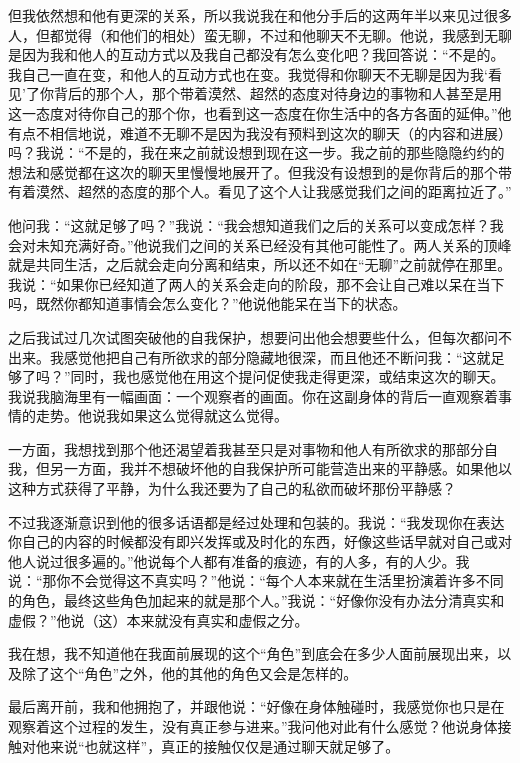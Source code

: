 但我依然想和他有更深的关系，所以我说我在和他分手后的这两年半以来见过很多人，但都觉得（和他们的相处）蛮无聊，不过和他聊天不无聊。他说，我感到无聊是因为我和他人的互动方式以及我自己都没有怎么变化吧？我回答说：“不是的。我自己一直在变，和他人的互动方式也在变。我觉得和你聊天不无聊是因为我‘看见’了你背后的那个人，那个带着漠然、超然的态度对待身边的事物和人甚至是用这一态度对待你自己的那个你，也看到这一态度在你生活中的各方各面的延伸。”他有点不相信地说，难道不无聊不是因为我没有预料到这次的聊天（的内容和进展）吗？我说：“不是的，我在来之前就设想到现在这一步。我之前的那些隐隐约约的想法和感觉都在这次的聊天里慢慢地展开了。但我没有设想到的是你背后的那个带有着漠然、超然的态度的那个人。看见了这个人让我感觉我们之间的距离拉近了。”

他问我：“这就足够了吗？”我说：“我会想知道我们之后的关系可以变成怎样？我会对未知充满好奇。”他说我们之间的关系已经没有其他可能性了。两人关系的顶峰就是共同生活，之后就会走向分离和结束，所以还不如在“无聊”之前就停在那里。我说：“如果你已经知道了两人的关系会走向的阶段，那不会让自己难以呆在当下吗，既然你都知道事情会怎么变化？”他说他能呆在当下的状态。

\tristarsepline

之后我试过几次试图突破他的自我保护，想要问出他会想要些什么，但每次都问不出来。我感觉他把自己有所欲求的部分隐藏地很深，而且他还不断问我：“这就足够了吗？”同时，我也感觉他在用这个提问促使我走得更深，或结束这次的聊天。我说我脑海里有一幅画面：一个观察者的画面。你在这副身体的背后一直观察着事情的走势。他说我如果这么觉得就这么觉得。

一方面，我想找到那个他还渴望着我甚至只是对事物和他人有所欲求的那部分自我，但另一方面，我并不想破坏他的自我保护所可能营造出来的平静感。如果他以这种方式获得了平静，为什么我还要为了自己的私欲而破坏那份平静感？

\tristarsepline

不过我逐渐意识到他的很多话语都是经过处理和包装的。我说：“我发现你在表达你自己的内容的时候都没有即兴发挥或及时化的东西，好像这些话早就对自己或对他人说过很多遍的。”他说每个人都有准备的痕迹，有的人多，有的人少。我说：“那你不会觉得这不真实吗？”他说：“每个人本来就在生活里扮演着许多不同的角色，最终这些角色加起来的就是那个人。”我说：“好像你没有办法分清真实和虚假？”他说（这）本来就没有真实和虚假之分。

我在想，我不知道他在我面前展现的这个“角色”到底会在多少人面前展现出来，以及除了这个“角色”之外，他的其他的角色又会是怎样的。

\tristarsepline

最后离开前，我和他拥抱了，并跟他说：“好像在身体触碰时，我感觉你也只是在观察着这个过程的发生，没有真正参与进来。”我问他对此有什么感觉？他说身体接触对他来说“也就这样”，真正的接触仅仅是通过聊天就足够了。

